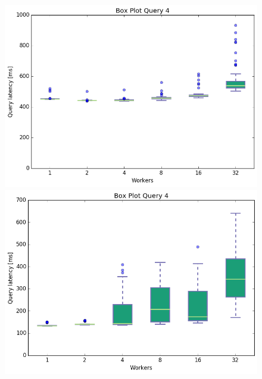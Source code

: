 \documentclass[11pt,singlecolumn]{scrartcl}
\begin{document}
\begin{figure}[!tbp]
  \centering
  \RawFloats
  \begin{minipage}[b]{0.5\textwidth}
    \includegraphics[width=\textwidth]{boxesfl/q4}
  \end{minipage}
  \hfill
  \begin{minipage}[b]{0.5\textwidth}
    \includegraphics[width=\textwidth]{boxesfs/q4}
  \end{minipage}
\end{figure}
\end{document}

